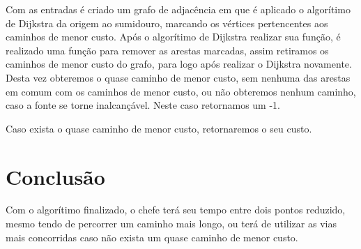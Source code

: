 \documentclass[12pt]{article}
\begin{document}
Com as entradas é criado um grafo de adjacência em que é aplicado o algorítimo de Dijkstra da origem ao sumidouro, marcando os vértices pertencentes aos caminhos de menor custo. Após o algorítimo de Dijkstra realizar sua função, é realizado uma função para remover as arestas marcadas, assim retiramos os caminhos de menor custo do grafo, para logo após realizar o Dijkstra novamente. Desta vez obteremos o quase caminho de menor custo, sem nenhuma das arestas em comum com os caminhos de menor custo, ou não obteremos nenhum caminho, caso a fonte se torne inalcançável. Neste caso retornamos um -1. 

Caso exista o quase caminho de menor custo, retornaremos o seu custo.


\section{Conclusão}

Com o algorítimo finalizado, o chefe terá seu tempo entre dois pontos reduzido, mesmo tendo de percorrer um caminho mais longo, ou terá de utilizar as vias mais concorridas caso não exista um quase caminho de menor custo.
\end{document}
